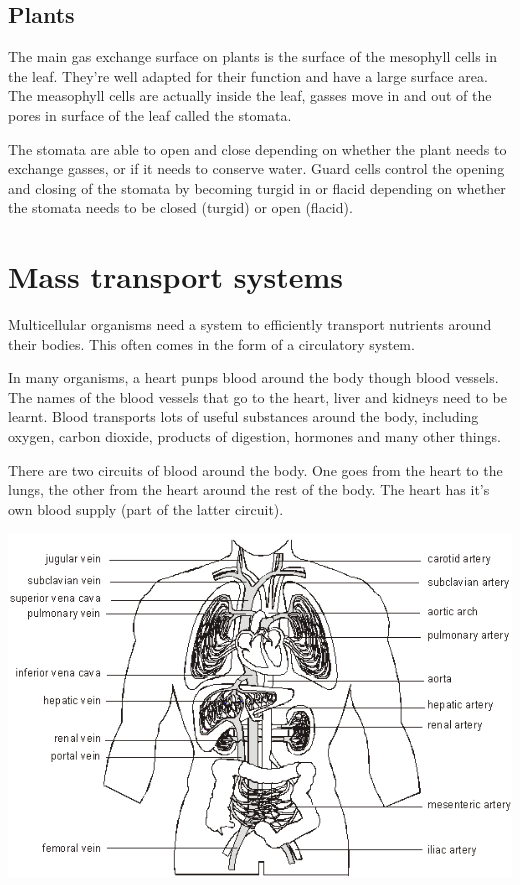 \documentclass{article}
\begin{document}
\subsection*{Plants}

The main gas exchange surface on plants is the surface of the mesophyll cells in
the leaf. They're well adapted for their function and have a large surface area.
The measophyll cells are actually inside the leaf, gasses move in and out of the
pores in surface of the leaf called the stomata.

The stomata are able to open and close depending on whether the plant needs to
exchange gasses, or if it needs to conserve water. Guard cells control the
opening and closing of the stomata by becoming turgid in or flacid depending on
whether the stomata needs to be closed (turgid) or open (flacid).

\section*{Mass transport systems}

Multicellular organisms need a system to efficiently transport nutrients around
their bodies. This often comes in the form of a circulatory system.

In many organisms, a heart punps blood around the body though blood vessels. The
names of the blood vessels that go to the heart, liver and kidneys need to be
learnt. Blood transports lots of useful substances around the body, including
oxygen, carbon dioxide, products of digestion, hormones and  many other things.

There are two circuits of blood around the body. One goes from the heart to the
lungs, the other from the heart around the rest of the body. The heart has it's
own blood supply (part of the latter circuit).

\begin{center}
	\includegraphics[scale=0.6]{circulatory_system}
\end{center}
\end{document}
